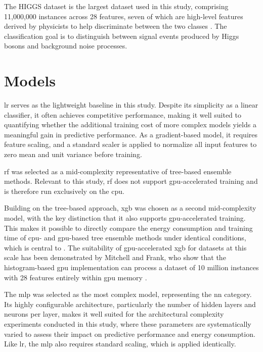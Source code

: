 The HIGGS \parencite{whitesonHIGGS2014} dataset is the largest dataset used in this study, comprising 11,000,000 instances across 28 features, seven of which are high-level features derived by physicists to help discriminate between the two classes \cite{baldiSearchingExoticParticles2014}. The classification goal is to distinguish between signal events produced by Higgs bosons and background noise processes.

\section{Models}
\label{design_models}

\gls{lr} serves as the lightweight baseline in this study. Despite its simplicity as a linear classifier, it often achieves competitive performance, making it well suited to quantifying whether the additional training cost of more complex models yields a meaningful gain in predictive performance. As a gradient-based model, it requires feature scaling, and a standard scaler is applied to normalize all input features to zero mean and unit variance before training.

\gls{rf} was selected as a mid-complexity representative of tree-based ensemble methods. Relevant to this study, \gls{rf} does not support \gls{gpu}-accelerated training and is therefore run exclusively on the \gls{cpu}.

Building on the tree-based approach, \gls{xgb} was chosen as a second mid-complexity model, with the key distinction that it also supports \gls{gpu}-accelerated training. This makes it possible to directly compare the energy consumption and training time of \gls{cpu}- and \gls{gpu}-based tree ensemble methods under identical conditions, which is central to . The suitability of \gls{gpu}-accelerated \gls{xgb} for datasets at this scale has been demonstrated by Mitchell and Frank, who show that the histogram-based \gls{gpu} implementation can process a dataset of 10 million instances with 28 features entirely within \gls{gpu} memory \cite{mitchellAcceleratingXGBoostAlgorithm2017}.

The \gls{mlp} was selected as the most complex model, representing the \gls{nn} category. Its highly configurable architecture, particularly the number of hidden layers and neurons per layer, makes it well suited for the architectural complexity experiments conducted in this study, where these parameters are systematically varied to assess their impact on predictive performance and energy consumption. Like \gls{lr}, the \gls{mlp} also requires standard scaling, which is applied identically.

